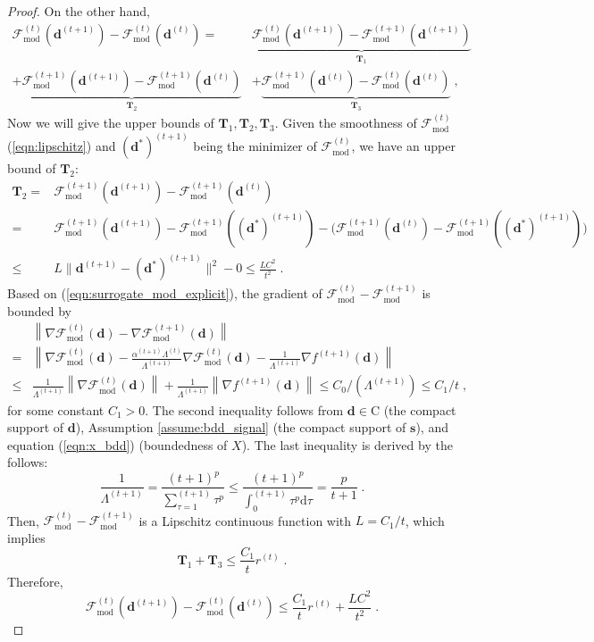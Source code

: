 \documentclass[final]{siamart1116}
\newcommand{\mb}[1]{\mathbf{#1}}
\providecommand{\norm}[1]{\left\lVert#1\right\rVert}
\def \F  {\mathcal{F}}
\def \T {\mathbf{T}}
\begin{document}
\begin{proof}
On the other hand,
\[
\begin{aligned}
\F^{(t)}_{\mathrm{mod}}(\mb{d}^{(t+1)}) - \F^{(t)}_{\mathrm{mod}}(\mb{d}^{(t)}) =& \underbrace{\F^{(t)}_{\mathrm{mod}}(\mb{d}^{(t+1)}) - \F^{(t+1)}_{\mathrm{mod}}(\mb{d}^{(t+1)})}_{\T_1}\\
+\underbrace{ \F^{(t+1)}_{\mathrm{mod}}(\mb{d}^{(t+1)}) - \F^{(t+1)}_{\mathrm{mod}}(\mb{d}^{(t)})}_{\T_2} &+ \underbrace{\F^{(t+1)}_{\mathrm{mod}}(\mb{d}^{(t)}) - \F^{(t)}_{\mathrm{mod}}(\mb{d}^{(t)})}_{\T_3} \;,
\end{aligned}
\]
Now we will give the upper bounds of $\T_1,\T_2,\T_3$. Given the smoothness of $\F_{\mathrm{mod}}^{(t)} $(\ref{eqn:lipschitz}) and $(\mb{d}^*)^{(t+1)}$ being the minimizer of $\F_{\mathrm{mod}}^{(t)}$, we have an upper bound of $\T_2$:
\begin{equation}
\label{eqn:ft1ft}
\begin{aligned}
\T_2 =& \F^{(t+1)}_{\mathrm{mod}}(\mb{d}^{(t+1)}) - \F^{(t+1)}_{\mathrm{mod}}(\mb{d}^{(t)})\\
=&\F^{(t+1)}_{\mathrm{mod}}(\mb{d}^{(t+1)}) - \F^{(t+1)}_{\mathrm{mod}}((\mb{d}^*)^{(t+1)}) - \Big(\F^{(t+1)}_{\mathrm{mod}}(\mb{d}^{(t)}) - \F^{(t+1)}_{\mathrm{mod}}((\mb{d}^*)^{(t+1)})\Big)\\
\leq& L\|\mb{d}^{(t+1)} - (\mb{d}^*)^{(t+1)}\|^2 - 0 \leq \frac{LC^2}{t^2} \;.
\end{aligned}
\end{equation}
Based on (\ref{eqn:surrogate_mod_explicit}), the gradient of $\F^{(t)}_{\mathrm{mod}}-\F^{(t+1)}_{\mathrm{mod}}$ is bounded by
\[
\begin{aligned}
&\norm{\nabla \F^{(t)}_{\mathrm{mod}}(\mb{d}) - \nabla \F^{(t+1)}_{\mathrm{mod}}(\mb{d}) }\\
=&\norm{\nabla \F^{(t)}_{\mathrm{mod}}(\mb{d}) - \frac{\alpha^{(t+1)}\Lambda^{(t)}}{\Lambda^{(t+1)}} \nabla \F^{(t)}_{\mathrm{mod}}(\mb{d}) - \frac{1}{\Lambda^{(t+1)}}\nabla f^{(t+1)}(\mb{d})}\\
\leq&\frac{1}{\Lambda^{(t+1)}} \norm{\nabla \F^{(t)}_{\mathrm{mod}}(\mb{d})} +  \frac{1}{\Lambda^{(t+1)}}\norm{\nabla f^{(t+1)}(\mb{d})}
\leq C_0 /(\Lambda^{(t+1)}) \leq C_1/t \;,
\end{aligned}
\]
for some constant $C_1>0$. The second inequality follows from $\mb{d} \in \text{C}$ (the compact support of $\mb{d}$), Assumption \ref{assume:bdd_signal} (the compact support of $\mb{s}$), and equation (\ref{eqn:x_bdd}) (boundedness of $X$). The last inequality is derived by the follows:
\[
\frac{1}{\Lambda^{(t+1)}} = \frac{(t+1)^p}{\sum_{\tau=1}^{(t+1)} \tau^p}\leq \frac{(t+1)^p}{\int_0^{(t+1)}\tau^p \mathrm{d}\tau } = \frac{p}{t+1} \;.
\]
Then, $\F^{(t)}_{\mathrm{mod}}-\F^{(t+1)}_{\mathrm{mod}}$ is a Lipschitz continuous function with $L = C_1 /t$, which implies
\[
\T_1+\T_3 \leq \frac{C_1}{t}r^{(t)} \;.
\]
Therefore,
\begin{equation}
\label{eq:second_bd}
\F^{(t)}_{\mathrm{mod}}(\mb{d}^{(t+1)}) - \F^{(t)}_{\mathrm{mod}}(\mb{d}^{(t)}) \leq \frac{C_1}{t}r^{(t)} + \frac{LC^2}{t^2} \;.
\end{equation}


\end{proof}
\end{document}
